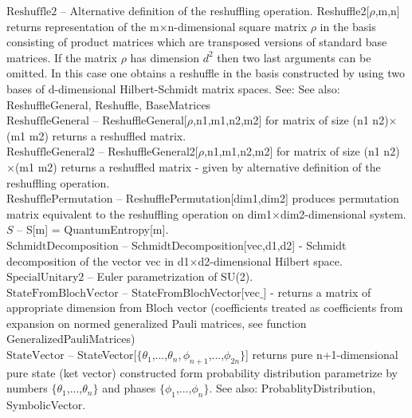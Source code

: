 \documentclass[a4paper,10pt]{scrartcl}
\begin{document}
\textbf{$ \text{Reshuffle2} $ }-- Alternative definition of the reshuffling operation. Reshuffle2[$\rho $,m,n] returns representation of the m$\times $n-dimensional square matrix $\rho $ in the basis consisting of product matrices which are transposed versions of standard base matrices. If the matrix $\rho $ has dimension $ d^2 $ then two last arguments can be omitted. In this case one obtains a reshuffle in the basis constructed by using two bases of d-dimensional Hilbert-Schmidt matrix spaces. See: See also: ReshuffleGeneral, Reshuffle, BaseMatrices$  $\\

\textbf{$ \text{ReshuffleGeneral} $ }-- ReshuffleGeneral[$\rho $,n1,m1,n2,m2] for matrix of size (n1 n2)$\times $(m1 m2) returns a reshuffled matrix.$  $\\

\textbf{$ \text{ReshuffleGeneral2} $ }-- ReshuffleGeneral2[$\rho $,n1,m1,n2,m2] for matrix of size (n1 n2)$\times $(m1 m2) returns a reshuffled matrix - given by alternative definition of the reshuffling operation.$  $\\

\textbf{$ \text{ReshufflePermutation} $ }-- ReshufflePermutation[dim1,dim2] produces permutation matrix equivalent to the reshuffling operation on dim1$\times $dim2-dimensional system.$  $\\

\textbf{$ S $ }-- S[m] = QuantumEntropy[m].$  $\\

\textbf{$ \text{SchmidtDecomposition} $ }-- SchmidtDecomposition[vec,d1,d2] - Schmidt decomposition of the vector vec in d1$\times $d2-dimensional Hilbert space.$  $\\

\textbf{$ \text{SpecialUnitary2} $ }-- Euler parametrization of SU(2).$  $\\

\textbf{$ \text{StateFromBlochVector} $ }-- StateFromBlochVector[vec$\_$] - returns a matrix of appropriate dimension from Bloch vector (coefficients treated as coefficients from expansion on normed generalized Pauli matrices, see function GeneralizedPauliMatrices)$  $\\

\textbf{$ \text{StateVector} $ }-- StateVector[$\{$$ \theta _1 $,...,$ \theta _n,\phi _{n+1} $,...,$ \phi _{2 n} $$\}$] returns pure n+1-dimensional pure state (ket vector) constructed form probability distribution parametrize by numbers $\{$$ \theta _1 $,...,$ \theta _n $$\}$ and phases $\{$$ \phi _1 $,...,$ \phi _n $$\}$. See also: ProbablityDistribution, SymbolicVector.$  $\\
\end{document}
